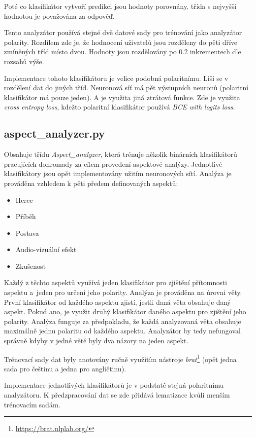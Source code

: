 Poté co klasifikátor vytvoří predikci jsou hodnoty porovnány, třída s nejvyšší hodnotou je považována za odpověď.

Tento analyzátor používá stejné dvě datové sady pro trénování jako analyzátor polarity. Rozdílem zde je, že hodnocení uživatelů jsou rozděleny do pěti dříve zmíněných tříd místo dvou. Hodnoty jsou rozdělovány po 0.2 inkrementech dle rozsahů výše.

Implementace tohoto klasifikátoru je velice podobná polaritnímu. Liší se v rozdělení dat do jiných tříd. Neuronová síť má pět výstupních neuronů (polaritní klasifikátor má pouze jeden). A je využita jiná ztrátová funkce. Zde je využita \emph{cross entropy loss}, kdežto polaritní klasifikátor používá \emph{BCE with logits loss}.

\subsection{aspect\_analyzer.py}
Obsahuje třídu \emph{Aspect\_analyzer}, která trénuje několik binárních %
klasifikátorů pracujících dohromady za cílem provedení aspektové analýzy. Jednotlivé klasifikátory jsou opět implementovány užitím neuronových sítí. Analýza je prováděna vzhledem k pěti předem definovaných aspektů:
\begin{itemize}
  \item Herec
  \item Příběh
  \item Postava
  \item Audio-vizuální efekt
  \item Zkušenost
\end{itemize}

Každý z těchto aspektů využívá jeden klasifikátor pro zjištění přítomnosti aspektu a~jeden pro určení jeho polarity. Analýza je prováděna na úrovni věty. První klasifikátor od každého aspektu zjistí, jestli daná věta obsahuje daný aspekt. Pokud ano, je využit druhý klasifikátor daného aspektu pro zjištění jeho polarity. 
Analýza funguje za předpokladu, že každá analyzovaná věta obsahuje maximálně jednu polaritu od každého aspektu. Analyzátor by tedy nefungoval správně kdyby v jedné větě byly dva názory na jeden aspekt. 

Trénovací sady dat byly anotovány ručně využitím nástroje \emph{brat}\footnote{\url{https://brat.nlplab.org/}} (opět jedna sada pro češtinu a jedna pro angličtinu).

Implementace jednotlivých klasifikátorů je v podstatě stejná polaritnímu analyzátoru. K předzpracování dat se zde přidává lematizace kvůli menším trénovacím sadám.


